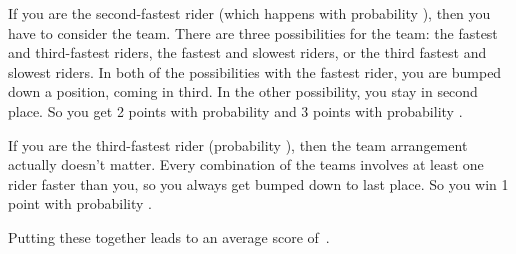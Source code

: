 \documentclass{article}
\begin{document}
If you are the second-fastest rider (which happens with probability ), then you have to consider the team.
There are three possibilities for the team: the fastest and third-fastest riders, the fastest and slowest riders, or the third fastest and slowest riders.
In both of the possibilities with the fastest rider, you are bumped down a position, coming in third.
In the other possibility, you stay in second place.
So you get 2 points with probability  and 3 points with probability .

If you are the third-fastest rider (probability ), then the team arrangement actually doesn't matter.
Every combination of the teams involves at least one rider faster than you, so you always get bumped down to last place.
So you win 1 point with probability .

Putting these together leads to an average score of
\,.
\end{document}
